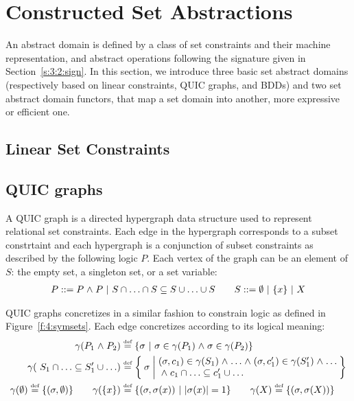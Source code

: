 \section{Constructed Set Abstractions}
\label{sec:constructed}
An abstract domain is defined by a class of set constraints and their machine
representation, and abstract operations following the signature given in
Section~\ref{s:3:2:sign}.
In this section, we introduce three basic set abstract domains (respectively
based on linear constraints, QUIC graphs, and BDDs) and two set abstract
domain functors, that map a set domain into another, more expressive or
efficient one.

\subsection{Linear Set Constraints}
\label{s:4:1:lin}

\subsection{QUIC graphs}
\label{s:4:2:quic}

A QUIC graph is a directed hypergraph data structure used to represent relational set constraints.  Each edge in the hypergraph corresponds to a subset constrtaint and each hypergraph is a conjunction of subset constraints as described by the following logic $P$.  Each vertex of the graph can be an element of $S$: the empty set, a singleton set, or a set variable:
\begin{align*}
  P ::= P \mathrel{\wedge} P \ | \ S \cap \ldots \cap S \subseteq S \cup \ldots \cup S \qquad
  S ::= \emptyset \ | \ \{x\} \ | \ X
\end{align*}

QUIC graphs concretizes in a similar fashion to constrain logic as defined in Figure~\ref{f:4:symsets}.  Each edge concretizes according to its logical meaning:
\begin{align*}
  \gamma(P_1 \logand P_2) &\defeq \{ \state \ | \ \state \in \gamma(P_1) \logand \state \in \gamma(P_2) \} \\
  \gamma(\ S_1 \cap \ldots \subseteq S'_1 \cup \ldots) &\defeq \Set{ \state | \begin{array}{@{}l@{}}
       (\state,c_1) \in \gamma(S_1) \logand \ldots \logand (\state,c'_1) \in \gamma(S'_1) \logand \ldots \\
       {} \logand c_1 \cap \ldots \subseteq c'_1 \cup \ldots
    \end{array}
  } \\
  \gamma(\emptyset) \defeq \{ (\state, \emptyset) \}
  \qquad \gamma(\{x\}) &\defeq \{ (\state, \state(x)) \ | \ |\state(x)| = 1 \} \qquad \gamma(X) \defeq \{ (\state, \state(X)) \}
\end{align*}

